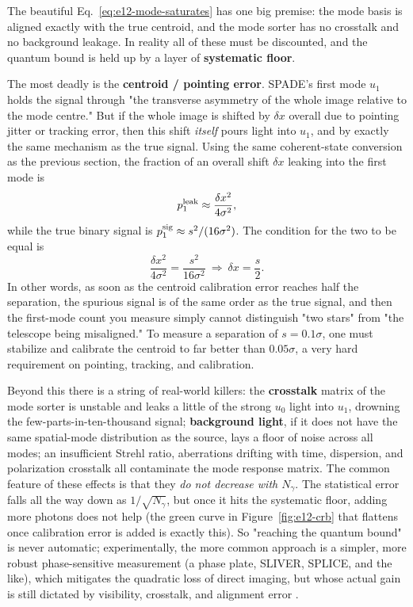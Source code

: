 The beautiful Eq.~\eqref{eq:e12-mode-saturates} has one big premise: the mode basis is aligned exactly with the true centroid, and the mode sorter has no crosstalk and no background leakage. In reality all of these must be discounted, and the quantum bound is held up by a layer of \textbf{systematic floor}.

The most deadly is the \textbf{centroid / pointing error}. SPADE's first mode $u_1$ holds the signal through "the transverse asymmetry of the whole image relative to the mode centre." But if the whole image is shifted by $\delta x$ overall due to pointing jitter or tracking error, then this shift \emph{itself} pours light into $u_1$, and by exactly the same mechanism as the true signal. Using the same coherent-state conversion as the previous section, the fraction of an overall shift $\delta x$ leaking into the first mode is
\[
  p_1^{\rm leak}\approx\frac{\delta x^{2}}{4\sigma^{2}},
\]
while the true binary signal is $p_1^{\rm sig}\approx s^2/(16\sigma^2)$. The condition for the two to be equal is
\[
  \frac{\delta x^{2}}{4\sigma^{2}}=\frac{s^{2}}{16\sigma^{2}}
  \ \Longrightarrow\ \delta x=\frac{s}{2}.
\]
In other words, as soon as the centroid calibration error reaches half the separation, the spurious signal is of the same order as the true signal, and then the first-mode count you measure simply cannot distinguish "two stars" from "the telescope being misaligned." To measure a separation of $s=0.1\sigma$, one must stabilize and calibrate the centroid to far better than $0.05\sigma$, a very hard requirement on pointing, tracking, and calibration.

Beyond this there is a string of real-world killers: the \textbf{crosstalk} matrix of the mode sorter is unstable and leaks a little of the strong $u_0$ light into $u_1$, drowning the few-parts-in-ten-thousand signal; \textbf{background light}, if it does not have the same spatial-mode distribution as the source, lays a floor of noise across all modes; an insufficient Strehl ratio, aberrations drifting with time, dispersion, and polarization crosstalk all contaminate the mode response matrix. The common feature of these effects is that they \emph{do not decrease with $N_\gamma$}. The statistical error falls all the way down as $1/\sqrt{N_\gamma}$, but once it hits the systematic floor, adding more photons does not help (the green curve in Figure~\ref{fig:e12-crb} that flattens once calibration error is added is exactly this). So "reaching the quantum bound" is never automatic; experimentally, the more common approach is a simpler, more robust phase-sensitive measurement (a phase plate, SLIVER, SPLICE, and the like), which mitigates the quadratic loss of direct imaging, but whose actual gain is still dictated by visibility, crosstalk, and alignment error \citep{2017PhRvL.118g0801T,2019NJPh...21i3010B,2018Optic...5.1177P}.

